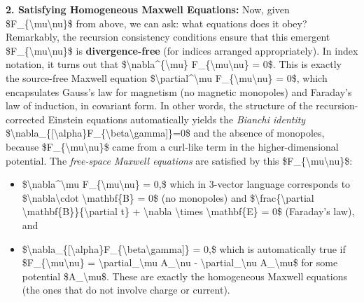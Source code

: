\documentclass[
]{article}
\begin{document}
{\textbf{2. Satisfying Homogeneous Maxwell Equations:} Now, given
\$F\_\{\textbackslash mu\textbackslash nu\}\$ from above, we can ask:
what equations does it obey? Remarkably, the recursion consistency
conditions ensure that this emergent
\$F\_\{\textbackslash mu\textbackslash nu\}\$ is
\textbf{divergence-free} (for indices arranged appropriately). In index
notation, it turns out that
\$\textbackslash nabla\^{}\{\textbackslash mu\}
F\_\{\textbackslash mu\textbackslash nu\} = 0\$\hspace{0pt}. This is
exactly the source-free Maxwell equation
\$\textbackslash partial\^{}\textbackslash mu
F\_\{\textbackslash mu\textbackslash nu\} = 0\$, which encapsulates
Gauss's law for magnetism (no magnetic monopoles) and Faraday's law of
induction, in covariant form. In other words, the structure of the
recursion-corrected Einstein equations automatically yields the
\emph{Bianchi identity}
\$\textbackslash nabla\_\{{[}\textbackslash alpha\}F\_\{\textbackslash beta\textbackslash gamma{]}\}=0\$
and the absence of monopoles, because
\$F\_\{\textbackslash mu\textbackslash nu\}\$ came from a curl-like term
in the higher-dimensional potential\hspace{0pt}. The \emph{free-space
Maxwell equations} are satisfied by this
\$F\_\{\textbackslash mu\textbackslash nu\}\$:

\begin{itemize}
\item
  \$\textbackslash nabla\^{}\textbackslash mu
  F\_\{\textbackslash mu\textbackslash nu\} = 0,\$ which in 3-vector
  language corresponds to \$\textbackslash nabla\textbackslash cdot
  \textbackslash mathbf\{B\} = 0\$ (no monopoles) and
  \$\textbackslash frac\{\textbackslash partial
  \textbackslash mathbf\{B\}\}\{\textbackslash partial t\} +
  \textbackslash nabla \textbackslash times \textbackslash mathbf\{E\} =
  0\$ (Faraday's law), and
\item
  \$\textbackslash nabla\_\{{[}\textbackslash alpha\}F\_\{\textbackslash beta\textbackslash gamma{]}\}
  = 0,\$ which is automatically true if
  \$F\_\{\textbackslash mu\textbackslash nu\} =
  \textbackslash partial\_\textbackslash mu A\_\textbackslash nu -
  \textbackslash partial\_\textbackslash nu A\_\textbackslash mu\$ for
  some potential \$A\_\textbackslash mu\$. These are exactly the
  homogeneous Maxwell equations (the ones that do not involve charge or
  current)\hspace{0pt}.
\end{itemize}

}
\end{document}
